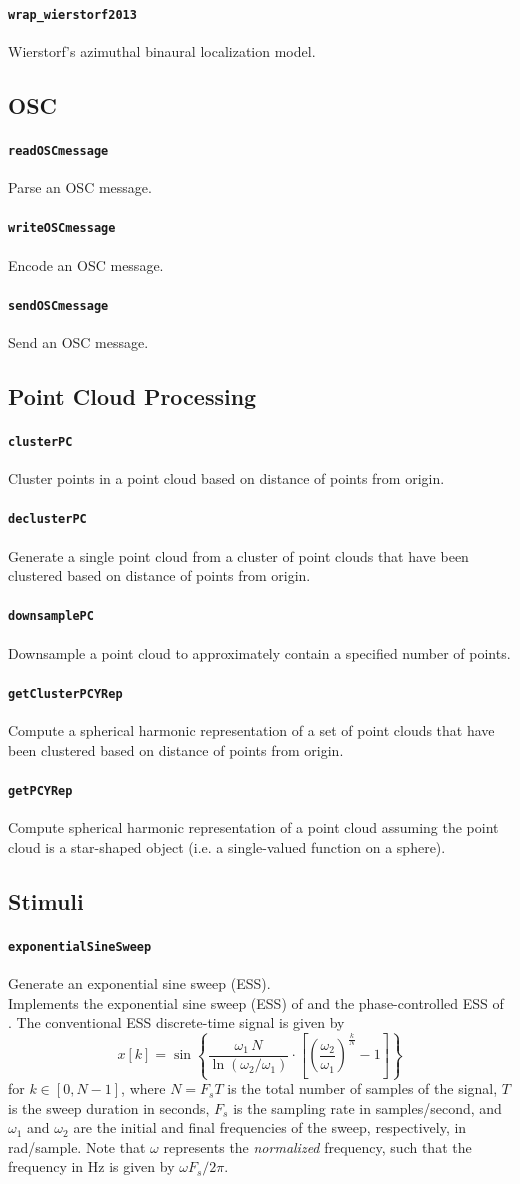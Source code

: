 \documentclass[11pt, oneside]{article}
\newcommand{\function}[1]{\paragraph*{\texttt{#1}}}
\begin{document}
\function{wrap\_wierstorf2013} Wierstorf's azimuthal binaural localization model.

\subsection{OSC}

\function{readOSCmessage} Parse an OSC message. \\

\function{writeOSCmessage} Encode an OSC message. \\

\function{sendOSCmessage} Send an OSC message. \\

\subsection{Point Cloud Processing}

\function{clusterPC} Cluster points in a point cloud based on distance of points from origin. \\

\function{declusterPC} Generate a single point cloud from a cluster of point clouds that have been clustered based on distance of points from origin. \\

\function{downsamplePC} Downsample a point cloud to approximately contain a specified number of points. \\

\function{getClusterPCYRep} Compute a spherical harmonic representation of a set of point clouds that have been clustered based on distance of points from origin. \\

\function{getPCYRep} Compute spherical harmonic representation of a point cloud assuming the point cloud is a star-shaped object (i.e. a single-valued function on a sphere). \\

\subsection{Stimuli}

\function{exponentialSineSweep} Generate an exponential sine sweep (ESS). \\
Implements the exponential sine sweep (ESS) of \citet{Farina2000} and the phase-controlled ESS of \citet{VetterdiRosario2011}.
The conventional ESS discrete-time signal is given by~\cite{Farina2000}
\begin{equation}
x[k] = \sin \left\{ \frac{\omega_1\,N}{\ln\left(\omega_2/\omega_1\right)} \cdot \left[\left(\frac{\omega_2}{\omega_1}\right)^{\frac{k}{N}}-1\right] \right\}
\end{equation}
for $k \in[0,N-1]$, where $N = F_s T$ is the total number of samples of the signal, $T$ is the sweep duration in seconds, $F_s$ is the sampling rate in samples/second, and $\omega_1$ and $\omega_2$ are the initial and final frequencies of the sweep, respectively, in rad/sample. Note that $\omega$ represents the \textit{normalized} frequency, such that the frequency in Hz is given by $\omega F_s/2 \pi$.
\end{document}

